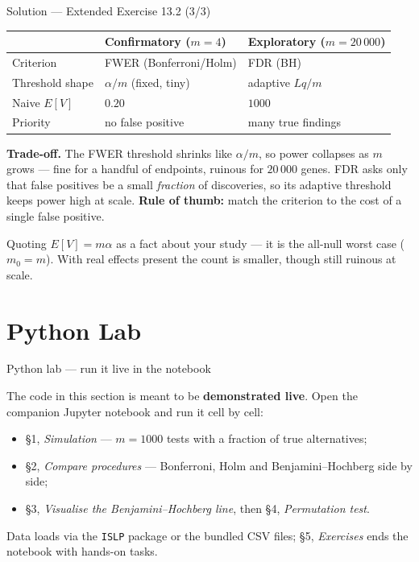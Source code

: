 \documentclass[aspectratio=169,11pt]{beamer}
\begin{document}
\begin{frame}{Solution --- Extended Exercise 13.2 (3/3)}
\begin{solutionbox}
  \begin{center}\footnotesize
  \begin{tabular}{lll}
    \toprule
     & Confirmatory ($m=4$) & Exploratory ($m=20\,000$) \\
    \midrule
    Criterion       & FWER (Bonferroni/Holm) & FDR (BH) \\
    Threshold shape & $\alpha/m$ (fixed, tiny) & adaptive $Lq/m$ \\
    Naive $E[V]$    & $0.20$ & $1000$ \\
    Priority        & no false positive & many true findings \\
    \bottomrule
  \end{tabular}
  \end{center}
  \textbf{Trade-off.} The FWER threshold shrinks like $\alpha/m$, so power collapses as
  $m$ grows --- fine for a handful of endpoints, ruinous for $20\,000$ genes. FDR asks
  only that false positives be a small \emph{fraction} of discoveries, so its adaptive
  threshold keeps power high at scale. \textbf{Rule of thumb:} match the criterion to the
  cost of a single false positive.

\end{solutionbox}
\begin{mistake}
  Quoting $E[V]=m\alpha$ as a fact about your study --- it is the all-null worst
  case ($m_0=m$). With real effects present the count is smaller, though still
  ruinous at scale.
\end{mistake}
\end{frame}

\section{Python Lab}

\begin{frame}{Python lab --- run it live in the notebook}
  \begin{labnote}
    The code in this section is meant to be \textbf{demonstrated live}. Open the companion Jupyter notebook and run it cell by cell:
    \begin{itemize}
      \item \S1, \emph{Simulation} --- $m=1000$ tests with a fraction of true alternatives;
      \item \S2, \emph{Compare procedures} --- Bonferroni, Holm and Benjamini--Hochberg side by side;
      \item \S3, \emph{Visualise the Benjamini--Hochberg line}, then \S4, \emph{Permutation test}.
    \end{itemize}
    Data loads via the \texttt{ISLP} package or the bundled CSV files; \S5, \emph{Exercises} ends the notebook with hands-on tasks.
  \end{labnote}
\end{frame}
\end{document}
